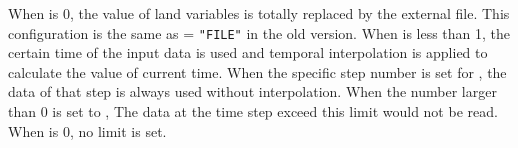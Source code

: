 When  is 0, the value of land variables is totally replaced by the external file. This configuration is the same as  = \verb|"FILE"| in the old version.
%
When  is less than 1, the certain time of the input data is used and temporal interpolation is applied to calculate the value of current time. When the specific step number is set for , the data of that step is always used without interpolation.
%
When the number larger than 0 is set to , The data at the time step exceed this limit would not be read. When  is 0, no limit is set.



